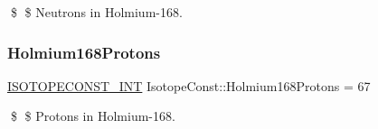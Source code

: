 \$ \$ Neutrons in Holmium-\/168. \mbox{\label{group___isotope_const-_holmium-_ho168_gae3cbf6efc4193367fb62bc1f692c553e}} 
\subsubsection{\texorpdfstring{Holmium168\+Protons}{Holmium168Protons}}
{\footnotesize\ttfamily \mbox{\hyperlink{group___isotope_const-_macros_ga5f18360b3e99483a35c32d789e62621c}{I\+S\+O\+T\+O\+P\+E\+C\+O\+N\+S\+T\+\_\+\+I\+NT}} Isotope\+Const\+::\+Holmium168\+Protons = 67}

\$ \$ Protons in Holmium-\/168. 